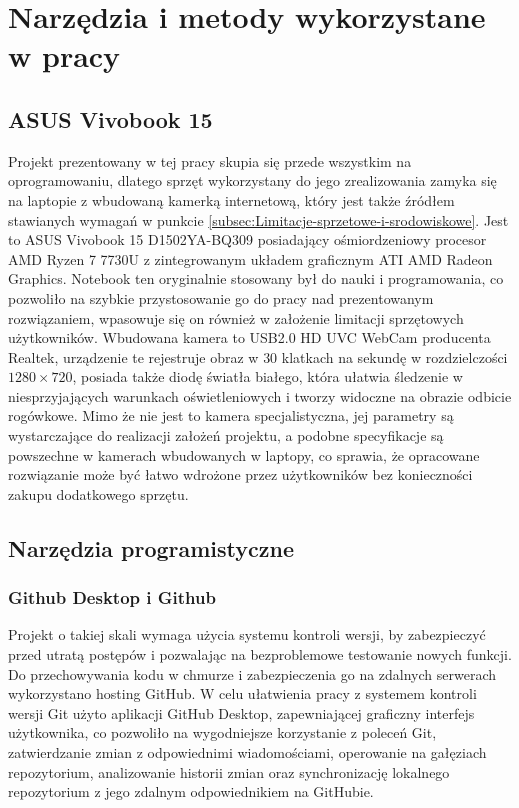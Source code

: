 \documentclass[a4paper,twoside,12pt]{book}
\begin{document}
\section{Narzędzia i metody wykorzystane w pracy}
\label{sec:Narzedzia-i-metody-wykorzystane-w-pracy}

\subsection{ASUS Vivobook 15}
\label{subsec:ASUS-Vivobook-15}

Projekt prezentowany w tej pracy skupia się przede wszystkim na oprogramowaniu, dlatego sprzęt wykorzystany do jego zrealizowania zamyka się na laptopie z wbudowaną kamerką internetową, który jest także źródłem stawianych wymagań w punkcie \ref{subsec:Limitacje-sprzetowe-i-srodowiskowe}. Jest to ASUS Vivobook 15 D1502YA-BQ309 posiadający ośmiordzeniowy procesor AMD Ryzen 7 7730U z zintegrowanym układem graficznym ATI AMD Radeon Graphics. Notebook ten oryginalnie stosowany był do nauki i programowania, co pozwoliło na szybkie przystosowanie go do pracy nad prezentowanym rozwiązaniem, wpasowuje się on również w założenie limitacji sprzętowych użytkowników. Wbudowana kamera to USB2.0 HD UVC WebCam producenta Realtek, urządzenie te rejestruje obraz w $30$ klatkach na sekundę w rozdzielczości $1280 \times 720$, posiada także diodę światła białego, która ułatwia śledzenie w niesprzyjających warunkach oświetleniowych i tworzy widoczne na obrazie odbicie rogówkowe. Mimo że nie jest to kamera specjalistyczna, jej parametry są wystarczające do realizacji założeń projektu, a podobne specyfikacje są powszechne w kamerach wbudowanych w laptopy, co sprawia, że opracowane rozwiązanie może być łatwo wdrożone przez użytkowników bez konieczności zakupu dodatkowego sprzętu.

\subsection{Narzędzia programistyczne}
\label{subsec:Narzedzia-programistyczne}

\subsubsection{Github Desktop i Github}

Projekt o takiej skali wymaga użycia systemu kontroli wersji, by zabezpieczyć przed utratą postępów i pozwalając na bezproblemowe testowanie nowych funkcji. Do przechowywania kodu w chmurze i zabezpieczenia go na zdalnych serwerach wykorzystano hosting GitHub. W celu ułatwienia pracy z systemem kontroli wersji Git użyto aplikacji GitHub Desktop, zapewniającej graficzny interfejs użytkownika, co pozwoliło na wygodniejsze korzystanie z poleceń Git, zatwierdzanie zmian z odpowiednimi wiadomościami, operowanie na gałęziach repozytorium, analizowanie historii zmian oraz synchronizację lokalnego repozytorium z jego zdalnym odpowiednikiem na GitHubie.
\end{document}
